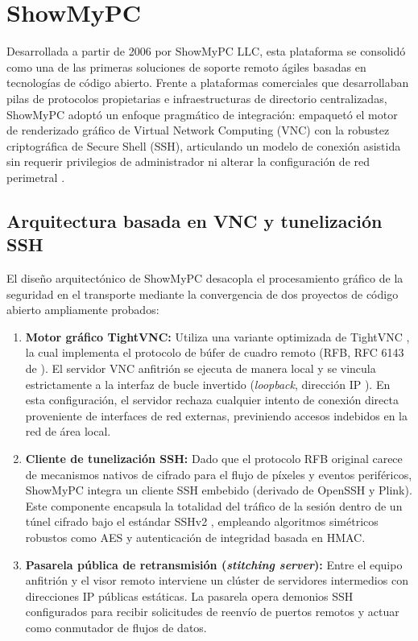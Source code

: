 \documentclass[12pt]{article}
\begin{document}
\section{ShowMyPC}\label{sec:showMyPC}

Desarrollada a partir de 2006 por ShowMyPC LLC, esta plataforma se consolidó como una de las primeras soluciones de soporte remoto ágiles basadas en tecnologías de código abierto. Frente a plataformas comerciales que desarrollaban pilas de protocolos propietarias e infraestructuras de directorio centralizadas, ShowMyPC adoptó un enfoque pragmático de integración: empaquetó el motor de renderizado gráfico de Virtual Network Computing (VNC) con la robustez criptográfica de Secure Shell (SSH), articulando un modelo de conexión asistida sin requerir privilegios de administrador ni alterar la configuración de red perimetral \parencite{showmypcUserGuide}.

\subsection{Arquitectura basada en VNC y tunelización SSH}\label{sec:showmypcArquitectura}

El diseño arquitectónico de ShowMyPC desacopla el procesamiento gráfico de la seguridad en el transporte mediante la convergencia de dos proyectos de código abierto ampliamente probados:
\begin{enumerate}[noitemsep, topsep=4pt]
    \item \textbf{Motor gráfico TightVNC:} Utiliza una variante optimizada de TightVNC \parencite{kaplinsky2001tightvnc}, la cual implementa el protocolo de búfer de cuadro remoto (RFB, RFC 6143 de \textcite{rfc6143}). El servidor VNC anfitrión se ejecuta de manera local y se vincula estrictamente a la interfaz de bucle invertido (\textit{loopback}, dirección IP ). En esta configuración, el servidor rechaza cualquier intento de conexión directa proveniente de interfaces de red externas, previniendo accesos indebidos en la red de área local.
    \item \textbf{Cliente de tunelización SSH:} Dado que el protocolo RFB original carece de mecanismos nativos de cifrado para el flujo de píxeles y eventos periféricos, ShowMyPC integra un cliente SSH embebido (derivado de OpenSSH y Plink). Este componente encapsula la totalidad del tráfico de la sesión dentro de un túnel cifrado bajo el estándar SSHv2 \parencite{rfc4251}, empleando algoritmos simétricos robustos como AES y autenticación de integridad basada en HMAC.
    \item \textbf{Pasarela pública de retransmisión (\textit{stitching server}):} Entre el equipo anfitrión y el visor remoto interviene un clúster de servidores intermedios con direcciones IP públicas estáticas. La pasarela opera demonios SSH configurados para recibir solicitudes de reenvío de puertos remotos y actuar como conmutador de flujos de datos.
\end{enumerate}
\end{document}
